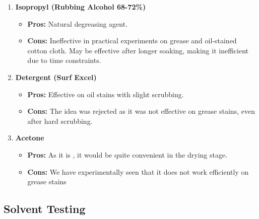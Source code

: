 \documentclass[table,french,english]{rapportCS}
\begin{document}
\begin{enumerate}
    \item \textbf{Isopropyl (Rubbing Alcohol 68-72\%)}
    \begin{itemize}[label=$\bullet$]
        \item \textbf{Pros:} Natural degreasing agent.
        \item \textbf{Cons:} Ineffective in practical experiments on grease and oil-stained cotton cloth. May be effective after longer soaking, making it inefficient due to time constraints.
    \end{itemize}

    \item \textbf{Detergent (Surf Excel)}
    \begin{itemize}[label=$\bullet$]
        \item \textbf{Pros:} Effective on oil stains with slight scrubbing.
        \item \textbf{Cons:} The idea was rejected as it was not effective on grease stains, even after hard scrubbing.
    \end{itemize}
    \item \textbf{Acetone}
    \begin{itemize}[label=$\bullet$]
        \item \textbf{Pros:} As it is , it would be quite convenient in the drying stage.

        \item \textbf{Cons:} We have experimentally seen that it does not work efficiently on grease stains

    \end{itemize}
\end{enumerate}
\newpage

\subsection{Solvent Testing}
\end{document}
